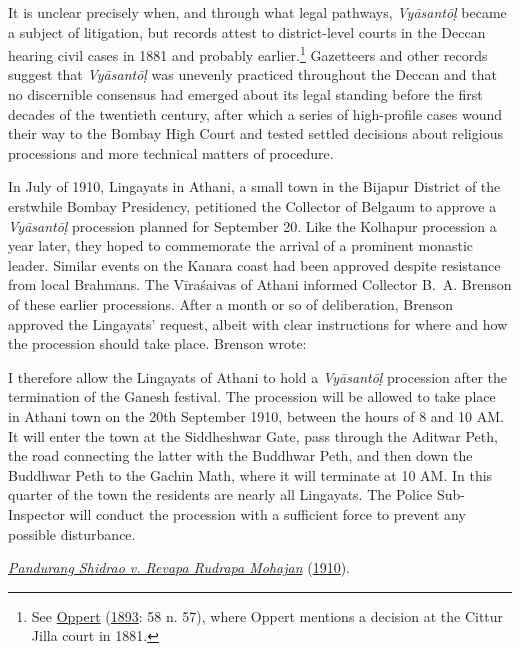 It is unclear precisely when, and through what legal pathways, \emph{Vyāsantōḷ} became a subject of litigation, but records attest to district-level courts in the Deccan hearing civil cases in 1881 and probably earlier.\footnote{%
See \hyperref[Oppert1893]{Oppert} (\hyperref[Oppert1893]{1893}: 58 n. 57), where Oppert mentions a decision at the Cittur Jilla court in 1881.
}
 Gazetteers and other records suggest that \emph{Vyāsantōḷ} was unevenly practiced throughout the Deccan and that no discernible consensus had emerged about its legal standing before the first decades of the twentieth century, after which a series of high-profile cases wound their way to the Bombay High Court and tested settled decisions about religious processions and more technical matters of procedure. 


In July of 1910, Lingayats in Athani, a small town in the Bijapur District of the erstwhile Bombay Presidency, petitioned the Collector of Belgaum to approve a \emph{Vyāsantōḷ} procession planned for September 20. Like the Kolhapur procession a year later, they hoped to commemorate the arrival of a prominent monastic leader. Similar events on the Kanara coast had been approved despite resistance from local Brahmans. The Vīraśaivas of Athani informed Collector B. A. Brenson of these earlier processions. After a month or so of deliberation, Brenson approved the Lingayats’ request, albeit with clear instructions for where and how the procession should take place. Brenson wrote: 

\begin{pullquote}
I therefore allow the Lingayats of Athani to hold a \emph{Vyāsantōḷ} procession after the termination of the Ganesh festival. The procession will be allowed to take place in Athani town on the 20th September 1910, between the hours of 8 and 10 AM. It will enter the town at the Siddheshwar Gate, pass through the Aditwar Peth, the road connecting the latter with the Buddhwar Peth, and then down the Buddhwar Peth to the Gachin Math, where it will terminate at 10 AM. In this quarter of the town the residents are nearly all Lingayats. The Police Sub-Inspector will conduct the procession with a sufficient force to prevent any possible disturbance.


\medskip\hfill\begin{minipage}{0.9\textwidth}\small\hfill
\hyperref[Pandurang]{\emph{Pandurang Shidrao v. Revapa Rudrapa Mohajan}} (\hyperref[Pandurang]{1910}).\end{minipage}\hspace{2em}
\end{pullquote}

